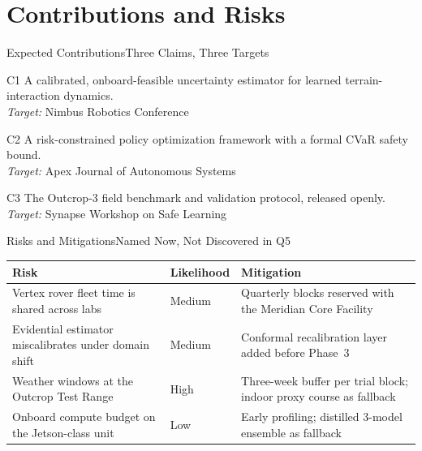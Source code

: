 \section{Contributions and Risks}

\begin{frame}{Expected Contributions}{Three Claims, Three Targets}
  \begin{minipage}[t]{0.32\textwidth}
    \begin{navybox}{C1}
      \footnotesize
      A calibrated, onboard-feasible uncertainty estimator for learned
      terrain-interaction dynamics.\\[4pt]
      \textit{Target:} Nimbus Robotics Conference
    \end{navybox}
  \end{minipage}\hfill
  \begin{minipage}[t]{0.32\textwidth}
    \begin{navybox}{C2}
      \footnotesize
      A risk-constrained policy optimization framework with a formal CVaR
      safety bound.\\[4pt]
      \textit{Target:} Apex Journal of Autonomous Systems
    \end{navybox}
  \end{minipage}\hfill
  \begin{minipage}[t]{0.32\textwidth}
    \begin{navybox}{C3}
      \footnotesize
      The Outcrop-3 field benchmark and validation protocol, released
      openly.\\[4pt]
      \textit{Target:} Synapse Workshop on Safe Learning
    \end{navybox}
  \end{minipage}
\end{frame}

\begin{frame}{Risks and Mitigations}{Named Now, Not Discovered in Q5}
  \begin{table}
    \centering
    \scriptsize
    \begin{tabular}{p{4.1cm}p{1.4cm}p{5.3cm}}
      \toprule
      \textbf{Risk} & \textbf{Likelihood} & \textbf{Mitigation} \\
      \midrule
      Vertex rover fleet time is shared across labs & Medium &
        Quarterly blocks reserved with the Meridian Core Facility \\
      Evidential estimator miscalibrates under domain shift & Medium &
        Conformal recalibration layer added before Phase~3 \\
      Weather windows at the Outcrop Test Range & High &
        Three-week buffer per trial block; indoor proxy course as fallback \\
      Onboard compute budget on the Jetson-class unit & Low &
        Early profiling; distilled 3-model ensemble as fallback \\
      \bottomrule
    \end{tabular}
  \end{table}
\end{frame}

